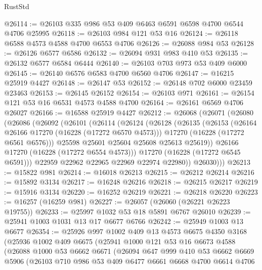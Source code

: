 \begin{lexlean}{RustStd}
\begin{coremodule}
@26114 := @26103 @335 @986 @53 @409 @6463 @6591 @6598 @4700 @6544 @4706 @25995
@26118 := @26103 @984 @121 @53 @16
@26124 := @26118 @6588 @4573 @4588 @4700 @6553 @4706
@26126 := @26088 @984 @53
@26128 := @26126 @6577 @6586
@26132 := @26094 @931 @983 @410 @53
@26135 := @26132 @6577 @6584 @6444
@26140 := @26103 @703 @973 @53 @409 @6000
@26145 := @26140 @6576 @6583 @4700 @6560 @4706
@26147 := @16215 @25919 @4427
@26148 := @26147 @53
@26152 := @26148 @702 @6000 @23459 @23463
@26153 := @26145 @26152
@26154 := @26103 @971
@26161 := @26154 @121 @53 @16 @6531 @4573 @4588 @4700
@26164 := @26161 @6569 @4706 @26027
@26166 := @16588 @25919 @4427
@26212 := @26068
    (@26071
      (@26080
        (@26086
          (@26092
            (@26101
              (@26114
                (@26124
                  (@26128
                    (@26135
                      (@26153
                        (@26164 @26166 @17270 (@16228 (@17272 @6570 @4573)))
                        @17270
                        (@16228 (@17272 @6561 @6576)))
                      @25598
                      @25601
                      @25604
                      @25608
                      @25613
                      @25619))
                  @26166
                  @17270
                  (@16228 (@17272 @6554 @4573)))
                @17270
                (@16228 (@17272 @6545 @6591)))
              @22959
              @22962
              @22965
              @22969
              @22974
              @22980))
          @26030)))
@26213 := @15822 @981
@26214 := @16018 @26213
@26215 := @26212 @26214
@26216 := @15892 @3134
@26217 := @16248 @26216
@26218 := @26215 @26217
@26219 := @15916 @3134
@26220 := @16252 @26219
@26221 := @26218 @26220
@26223 := @16257 (@16259 @981)
@26227 := @26057 (@26060 (@26221 @26223 @19755))
@26233 := @25997 @1032 @53 @18 @5891 @6767 @26010
@26239 := @25941 @1003 @1031 @13 @17 @6677 @6766
@26242 := @25949 @1003 @13 @6677
@26354 := @25926
    @997
    @1002
    @409
    @13
    @4573
    @6675
    @4350
    @3168
    (@25936
      @1002
      @409
      @6675
      (@25941
        @1000
        @121
        @53
        @16
        @6673
        @4588
        (@26088
          @1000
          @53
          @6662
          @6671
          (@26094
            @647
            @999
            @410
            @53
            @6662
            @6669
            @5906
            (@26103
              @710
              @986
              @53
              @409
              @6477
              @6661
              @6668
              @4700
              @6614
              @4706

\end{coremodule}
\end{lexlean}
